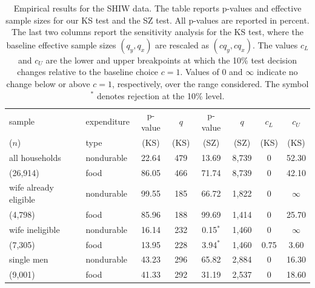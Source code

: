 \documentclass[11pt]{article}
\numberwithin{equation}{section}
\begin{document}
\begin{table}[h]\small 
    \centering
    \begin{tabular}{llcccccc}
      \hline
      \multicolumn{1}{l}{{sample}} &
      \multicolumn{1}{l}{{expenditure}} &
      \multicolumn{1}{c}{{p-value}} &
      \multicolumn{1}{c}{{$q$}} &
      \multicolumn{1}{c}{{p-value}} &
      \multicolumn{1}{c}{{$q$}} &
      \multicolumn{1}{c}{{$c_L$}} &
      \multicolumn{1}{c}{{$c_U$}} \\
      \multicolumn{1}{l}{{($n$)}} &
      \multicolumn{1}{l}{{type}} &
      \multicolumn{1}{c}{{(KS)}} &
      \multicolumn{1}{c}{{(KS)}} &
      \multicolumn{1}{c}{{(SZ)}} &
      \multicolumn{1}{c}{{(SZ)}} &
      \multicolumn{1}{c}{{(KS)}} &
      \multicolumn{1}{c}{{(KS)}}\\
      \hline
       all households & nondurable & 22.64 & 479 & 13.69 & 8,739 & 0 & 52.30 \\
       (26,914) & food & 86.05 & 466 & 71.74 & 8,739 & 0 & 42.10 \\
       \hline
       wife already eligible & nondurable & 99.55 & 185 & 66.72 & 1,822 & 0 & $\infty$ \\
       (4,798) & food & 85.96 & 188 & 99.69 & 1,414 & 0 & 25.70 \\
       \hline
       wife ineligible & nondurable & 16.14 & 232 & 0.15$^{*}$ & 1,460 & 0 & $\infty$ \\
       (7,305) & food & 13.95 & 228 & 3.94$^{*}$ & 1,460 & 0.75 & 3.60 \\
       \hline
       single men & nondurable & 43.23 & 296 & 65.82 & 2,884 & 0 & 16.30 \\
       (9,001) & food & 41.33 & 292 & 31.19 & 2,537 & 0 & 18.60 \\
       \hline
    \end{tabular}
    \caption{\small Empirical results for the SHIW data. The table reports p-values and effective sample sizes for our KS test and the SZ test. All p-values are reported in percent. The last two columns report the sensitivity analysis for the KS test, where the baseline effective sample sizes $(q_y,q_x)$ are rescaled as $(cq_y,cq_x)$. The values $c_L$ and $c_U$ are the lower and upper breakpoints at which the 10\% test decision changes relative to the baseline choice $c=1$. Values of $0$ and $\infty$ indicate no change below or above $c=1$, respectively, over the range considered. The symbol $^{*}$ denotes rejection at the 10\% level.}
     \label{tab:empApplication}
\end{table}
\end{document}
